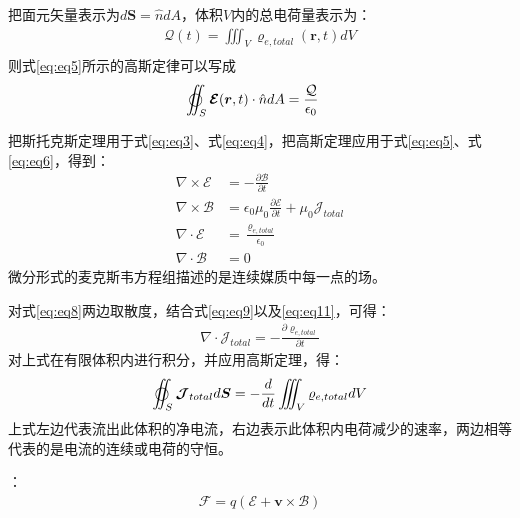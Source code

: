 \documentclass{article}
\numberwithin{equation}{section}
\renewcommand{\vec}[1]{\boldsymbol{#1}}
\begin{document}
把面元矢量表示为$d\vec{S}=\hat{n}dA$，体积$V$内的总电荷量表示为：
\begin{align}
    \mathcal{Q}(t)=\iiint_V \varrho _{e,total}(\vec{r},t)dV \\
\end{align}
则式\ref{eq:eq5}所示的高斯定律可以写成
\begin{align}
    \varoiint_S \vec{\mathcal{E}} (\vec{r},t)\cdot \hat{n}dA&=\frac{\mathcal{Q}}{\epsilon_0}
\end{align}
\par
把斯托克斯定理用于式\ref{eq:eq3}、式\ref{eq:eq4}，把高斯定理应用于式\ref{eq:eq5}、式\ref{eq:eq6}，得到\textbf{\color{blue}{麦克斯韦方程组的微分形式}}：
\begin{align}
    \label{eq:eq7}
    \nabla \times \vec{\mathcal{E}}&=-\frac{\partial \vec{\mathcal{B}}}{\partial t} \\
    \label{eq:eq8}
    \nabla \times \vec{\mathcal{B}}&=\epsilon_0 \mu_0 \frac{\partial \vec{\mathcal{E}}}{\partial t}+\mu_0 \vec{\mathcal{J}}_{total} \\
    \label{eq:eq9}
    \nabla \cdot \vec{\mathcal{E}}&=\frac{\varrho _{e,total}}{\epsilon_0} \\
    \label{eq:eq10}
    \nabla \cdot \vec{\mathcal{B}}&=0
\end{align}
微分形式的麦克斯韦方程组描述的是连续媒质中每一点的场。\par
对式\ref{eq:eq8}两边取散度，结合式\ref{eq:eq9}以及\ref{eq:eq11}，可得\textbf{\color{blue}{电流连续性方程的微分形式}}：
\begin{align}
    \nabla \cdot \vec{\mathcal{J}}_{total}=-\frac{\partial \varrho _{e,total}}{\partial t}
\end{align}
对上式在有限体积内进行积分，并应用高斯定理，得\textbf{\color{blue}{电流连续性方程的积分形式}}：
\begin{align}
    \varoiint_S \vec{\mathcal{J}}_{total} d\vec{S}=-\frac{d}{dt}\iiint_V \varrho _{e,total} dV
\end{align}
上式左边代表流出此体积的净电流，右边表示此体积内电荷减少的速率，两边相等代表的是电流的连续或电荷的守恒。\par
\textbf{\color{blue}{洛伦兹力}}：
\begin{align}
    \vec{\mathcal{F}}=q(\vec{\mathcal{E}}+\vec{v}\times \vec{\mathcal{B}})
\end{align}
\end{document}
